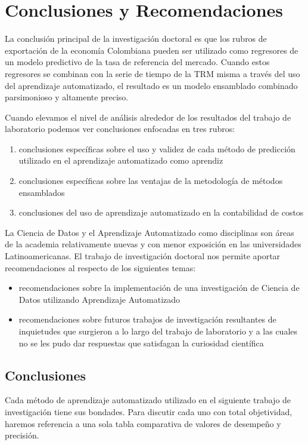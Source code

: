 \chapter{Conclusiones y Recomendaciones}
La conclusión principal de la investigación doctoral es que los rubros de exportación de la economía Colombiana pueden ser utilizado como regresores de un modelo predictivo de la tasa de referencia del mercado. Cuando estos regresores se combinan con la serie de tiempo de la TRM misma a través del uso del aprendizaje automatizado, el resultado es un modelo ensamblado combinado parsimonioso y altamente preciso.

Cuando elevamos el nivel de análisis alrededor de los resultados del trabajo de laboratorio podemos ver conclusiones enfocadas en tres rubros:

\begin{enumerate}
  \item conclusiones específicas sobre el uso y validez de cada método de predicción utilizado en el aprendizaje automatizado como aprendiz
  \item conclusiones específicas sobre las ventajas de la metodología de métodos ensamblados
  \item conclusiones del uso de aprendizaje automatizado en la contabilidad de costos
\end{enumerate}

La Ciencia de Datos y el Aprendizaje Automatizado como disciplinas son áreas de la academia relativamente nuevas y con menor exposición en las universidades Latinoamericanas. El trabajo de investigación doctoral nos permite aportar recomendaciones al respecto de los siguientes temas:

\begin{itemize}
  \item recomendaciones sobre la implementación de una investigación de Ciencia de Datos utilizando Aprendizaje Automatizado
  \item recomendaciones sobre futuros trabajos de investigación resultantes de inquietudes que surgieron a lo largo del trabajo de laboratorio y a las cuales no se les pudo dar respuestas que satisfagan la curiosidad científica
\end{itemize}

\section{Conclusiones}
Cada método de aprendizaje automatizado utilizado en el siguiente trabajo de investigación tiene sus bondades. Para discutir cada uno con total objetividad, haremos referencia a una sola tabla comparativa de valores de desempeño y precisión.

